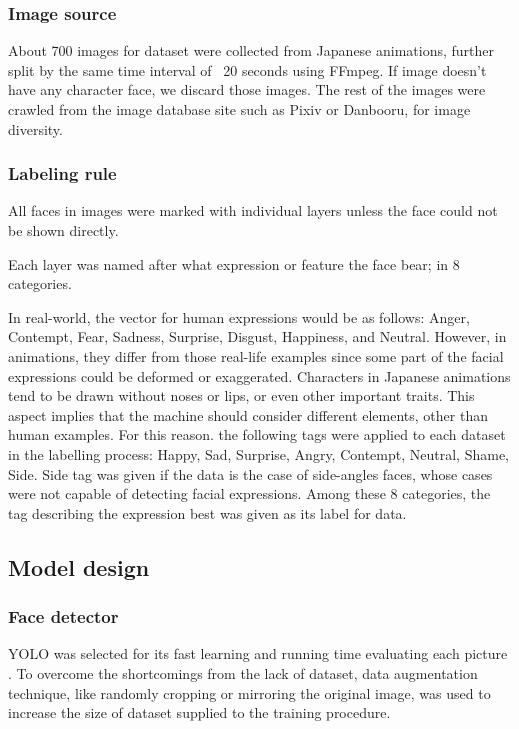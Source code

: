 \documentclass{article}
\begin{document}
\subsubsection{Image source}
About 700 images for dataset were collected from Japanese animations, further
split by the same time interval of ~20 seconds using FFmpeg. If image doesn’t
have any character face, we discard those images. The rest of the images were
crawled from the image database site such as Pixiv or Danbooru, for image
diversity.

\subsubsection{Labeling rule}
All faces in images were marked with individual layers unless the face could not
be shown directly.

Each layer was named after what expression or feature the face bear; in 8
categories.

In real-world, the vector for human expressions would be as follows: Anger,
Contempt, Fear, Sadness, Surprise, Disgust, Happiness, and Neutral. However, in
animations, they differ from those real-life examples since some part of the
facial expressions could be deformed or exaggerated. Characters in Japanese
animations tend to be drawn without noses or lips, or even other important
traits. This aspect implies that the machine should consider different elements,
other than human examples. For this reason. the following tags were applied to
each dataset in the labelling process: Happy, Sad, Surprise, Angry, Contempt,
Neutral, Shame, Side. Side tag was given if the data is the case of side-angles
faces, whose cases were not capable of detecting facial expressions. Among these
8 categories, the tag describing the expression best was given as its label for
data.

\subsection{Model design}
\subsubsection{Face detector}
YOLO was selected for its fast learning and running time evaluating each picture
\cite{redmon2018yolov3}. To overcome the shortcomings from the lack of dataset,
data augmentation technique, like randomly cropping or mirroring the original
image, was used to increase the size of dataset supplied to the training
procedure.
\end{document}
